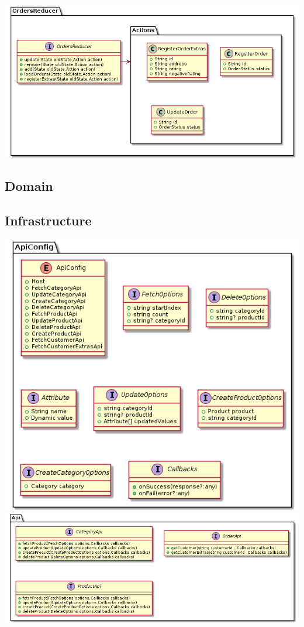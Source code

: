 \documentclass{article}
\begin{document}
\includegraphics[scale=0.5]{./out/ReactApp/Application/OrdersReducer/OrdersReducer.png}\\

\subsection{Domain}
\subsection{Infrastructure}
\includegraphics[scale=0.5]{./out/ReactApp/Infrastructure/ApiConfig/ApiConfig.png}\\
\includegraphics[scale=0.5]{./out/ReactApp/Infrastructure/Api/Api.png}
\end{document}
